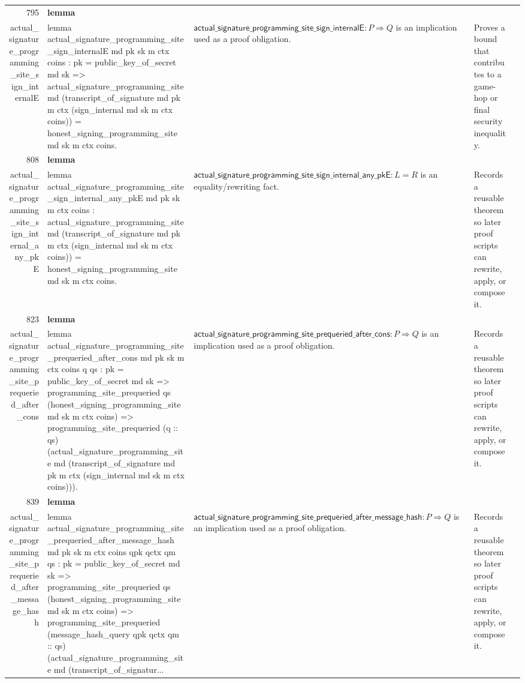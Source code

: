 \documentclass[10pt]{article}
\newcommand{\ec}[1]{\begingroup\ttfamily\scriptsize #1\endgroup}
\begin{document}
\begin{longtable}{r L{0.17\textwidth} L{0.26\textwidth} L{0.27\textwidth} L{0.20\textwidth}}
795 & \textbf{lemma}\\\ec{actual\_signature\_programming\_site\_sign\_internalE} & \ec{lemma actual\_signature\_programming\_site\_sign\_internalE md pk sk m ctx coins : pk = public\_key\_of\_secret md sk => actual\_signature\_programming\_site md (transcript\_of\_signature md pk m ctx (sign\_internal md sk m ctx coins)) = honest\_signing\_programming\_site md sk m ctx coins.} & \(\mathsf{actual\_signature\_programming\_site\_sign\_internalE} : P \Rightarrow Q\) is an implication used as a proof obligation. & Proves a bound that contributes to a game-hop or final security inequality. \\
808 & \textbf{lemma}\\\ec{actual\_signature\_programming\_site\_sign\_internal\_any\_pkE} & \ec{lemma actual\_signature\_programming\_site\_sign\_internal\_any\_pkE md pk sk m ctx coins : actual\_signature\_programming\_site md (transcript\_of\_signature md pk m ctx (sign\_internal md sk m ctx coins)) = honest\_signing\_programming\_site md sk m ctx coins.} & \(\mathsf{actual\_signature\_programming\_site\_sign\_internal\_any\_pkE} : L = R\) is an equality/rewriting fact. & Records a reusable theorem so later proof scripts can rewrite, apply, or compose it. \\
823 & \textbf{lemma}\\\ec{actual\_signature\_programming\_site\_prequeried\_after\_cons} & \ec{lemma actual\_signature\_programming\_site\_prequeried\_after\_cons md pk sk m ctx coins q qs : pk = public\_key\_of\_secret md sk => programming\_site\_prequeried qs (honest\_signing\_programming\_site md sk m ctx coins) => programming\_site\_prequeried (q :: qs) (actual\_signature\_programming\_site md (transcript\_of\_signature md pk m ctx (sign\_internal md sk m ctx coins))).} & \(\mathsf{actual\_signature\_programming\_site\_prequeried\_after\_cons} : P \Rightarrow Q\) is an implication used as a proof obligation. & Records a reusable theorem so later proof scripts can rewrite, apply, or compose it. \\
839 & \textbf{lemma}\\\ec{actual\_signature\_programming\_site\_prequeried\_after\_message\_hash} & \ec{lemma actual\_signature\_programming\_site\_prequeried\_after\_message\_hash md pk sk m ctx coins qpk qctx qm qs : pk = public\_key\_of\_secret md sk => programming\_site\_prequeried qs (honest\_signing\_programming\_site md sk m ctx coins) => programming\_site\_prequeried (message\_hash\_query qpk qctx qm :: qs) (actual\_signature\_programming\_site md (transcript\_of\_signatur...} & \(\mathsf{actual\_signature\_programming\_site\_prequeried\_after\_message\_hash} : P \Rightarrow Q\) is an implication used as a proof obligation. & Records a reusable theorem so later proof scripts can rewrite, apply, or compose it. \\

\end{longtable}
\end{document}
